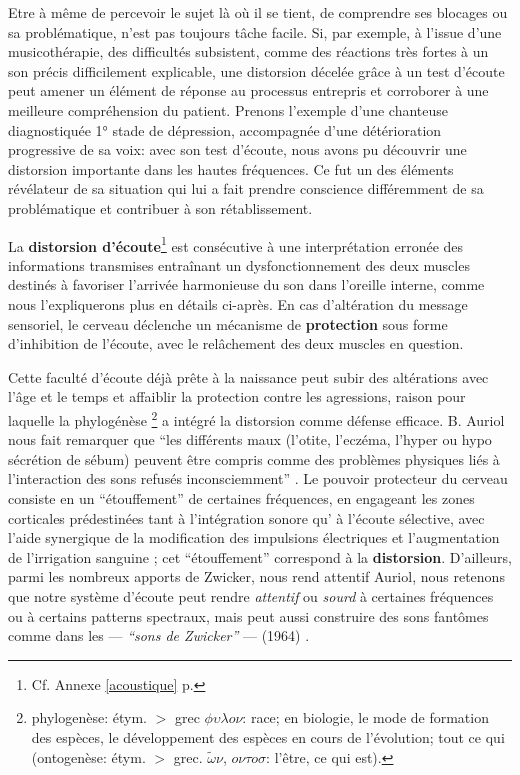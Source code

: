 Etre à même de percevoir le sujet là où il se tient, de comprendre ses blocages ou sa problématique, 
n'est pas toujours tâche facile.
Si, par exemple, à l'issue d'une musicothérapie, des difficultés subsistent, comme des réactions très 
fortes à un son précis difficilement explicable,  une distorsion décelée grâce à un test 
d'écoute peut amener un élément de réponse au processus entrepris et corroborer à une meilleure  
compréhension du patient.   
Prenons  l'exemple d'une chanteuse diagnostiquée 1° stade de dépression, accompagnée d'une 
détérioration progressive de sa voix:  avec son test d'écoute, nous avons pu découvrir une distorsion 
importante dans les hautes fréquences. Ce fut un des éléments révélateur de sa situation qui lui a fait 
prendre conscience différemment  de sa problématique et contribuer à son rétablissement.


 La \textbf{distorsion d'écoute}\footnote {Cf. Annexe \ref{acoustique} p. \pageref{acoustique}} %
 est consécutive à une interprétation
erronée des informations transmises entraînant un dysfonctionnement
des deux muscles destinés à favoriser l'arrivée
harmonieuse du son dans l'oreille interne, comme nous l'expliquerons plus en détails ci-après.
En cas d'altération du message sensoriel,
le cerveau déclenche un mécanisme de\textbf{ protection} sous forme
d'inhibition de l'écoute, avec le relâchement des deux muscles en
question. 

Cette faculté d'écoute déjà prête à la naissance peut subir des
altérations avec l'âge et
le temps et affaiblir la protection contre les agressions, raison pour
laquelle la phylogénèse \footnote{ phylogenèse: étym. $>$ grec $\phi
  \upsilon \lambda o \nu $: race; en biologie, le mode de formation des espèces, le développement
  des espèces en cours de l'évolution; tout ce qui (ontogenèse:
  étym. $>$ grec. $\tilde{\omega}\nu$, $o \nu \tau o
  \sigma$: l'être,
ce qui est).}  a intégré la distorsion comme défense
efficace.
B. Auriol nous fait
remarquer que
\enquote {les différents maux (l'otite, l'eczéma, l'hyper
ou hypo sécrétion de sébum) peuvent être compris comme des problèmes physiques liés à l'interaction des sons refusés
inconsciemment} \autocite [19--20]  {auriol:cle}.
Le pouvoir protecteur du cerveau consiste en un  ``étouffement'' de
certaines fréquences,  en engageant les zones corticales prédestinées
tant à
l'intégration sonore qu' à l'écoute sélective,  avec l'aide synergique de la
modification des impulsions électriques et l'augmentation de
l'irrigation sanguine \autocite [14] {auriol:cle};
cet ``étouffement'' correspond à la \textbf{distorsion}.
D'ailleurs,  parmi les nombreux apports de Zwicker, nous rend attentif Auriol,  nous retenons que 
notre 
système d'écoute peut rendre
\textit{attentif} ou\textit{ sourd} à certaines fréquences ou à certains patterns
spectraux, mais peut aussi construire des sons fantômes comme dans les --- \textit{``sons de 
Zwicker''} --- (1964) \autocite%
 {auriol:cle}.


